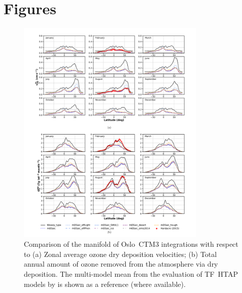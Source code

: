 \documentclass[gmd, manuscript]{copernicus}
\begin{document}
\appendix
\section{Figures}    %

\appendixfigures
\begin{figure}[!htbp]
  \includegraphics[width=0.8\textwidth]{fig10}
  \caption{Comparison of the manifold of Oslo~CTM3 integrations with respect to (a) Zonal average ozone dry deposition velocities; (b) Total annual amount of ozone removed from the atmosphere via dry deposition. The multi-model mean from the evaluation of TF~HTAP models by \citet{ACP:Hardacre2015} is shown as a reference (where available).}
  \label{fig:mmm_drydep_season}
\end{figure}
\end{document}
